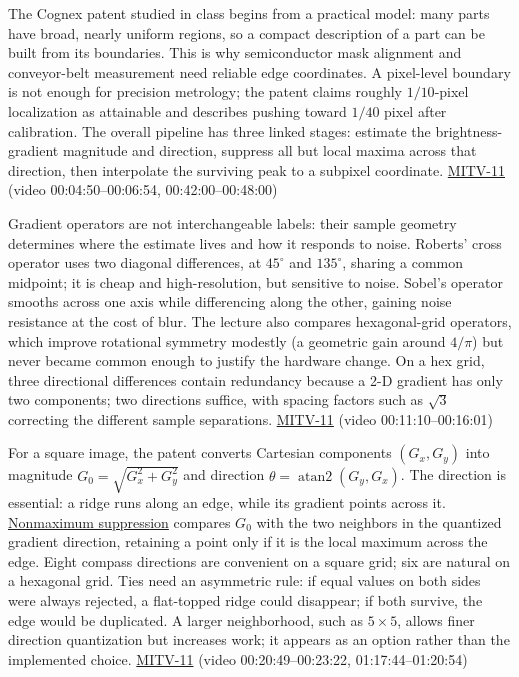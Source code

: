 The Cognex patent studied in class begins from a practical model: many parts have broad, nearly uniform regions, so a compact description of a part can be built from its boundaries. This is why semiconductor mask alignment and conveyor-belt measurement need reliable edge coordinates. A pixel-level boundary is not enough for precision metrology; the patent claims roughly \(1/10\)-pixel localization as attainable and describes pushing toward \(1/40\) pixel after calibration. The overall pipeline has three linked stages: estimate the brightness-gradient magnitude and direction, suppress all but local maxima across that direction, then interpolate the surviving peak to a subpixel coordinate. \hyperref[04-visual-computing-ii-ch036-mitv-11---edge-detection-subpixel-position-cordic-line-detection-us-6408109]{MITV-11} (video 00:04:50--00:06:54, 00:42:00--00:48:00)

Gradient operators are not interchangeable labels: their sample geometry determines where the estimate lives and how it responds to noise. Roberts' cross operator uses two diagonal differences, at \(45^\circ\) and \(135^\circ\), sharing a common midpoint; it is cheap and high-resolution, but sensitive to noise. Sobel's operator smooths across one axis while differencing along the other, gaining noise resistance at the cost of blur. The lecture also compares hexagonal-grid operators, which improve rotational symmetry modestly (a geometric gain around \(4/\pi\)) but never became common enough to justify the hardware change. On a hex grid, three directional differences contain redundancy because a 2-D gradient has only two components; two directions suffice, with spacing factors such as \(\sqrt3\) correcting the different sample separations. \hyperref[04-visual-computing-ii-ch036-mitv-11---edge-detection-subpixel-position-cordic-line-detection-us-6408109]{MITV-11} (video 00:11:10--00:16:01)

For a square image, the patent converts Cartesian components \((G_x,G_y)\) into magnitude \(G_0=\sqrt{G_x^2+G_y^2}\) and direction \(\theta=\operatorname{atan2}(G_y,G_x)\). The direction is essential: a ridge runs along an edge, while its gradient points across it. \hyperref[appendix-36022286b03e]{Nonmaximum suppression} compares \(G_0\) with the two neighbors in the quantized gradient direction, retaining a point only if it is the local maximum across the edge. Eight compass directions are convenient on a square grid; six are natural on a hexagonal grid. Ties need an asymmetric rule: if equal values on both sides were always rejected, a flat-topped ridge could disappear; if both survive, the edge would be duplicated. A larger neighborhood, such as \(5\times5\), allows finer direction quantization but increases work; it appears as an option rather than the implemented choice. \hyperref[04-visual-computing-ii-ch036-mitv-11---edge-detection-subpixel-position-cordic-line-detection-us-6408109]{MITV-11} (video 00:20:49--00:23:22, 01:17:44--01:20:54)

